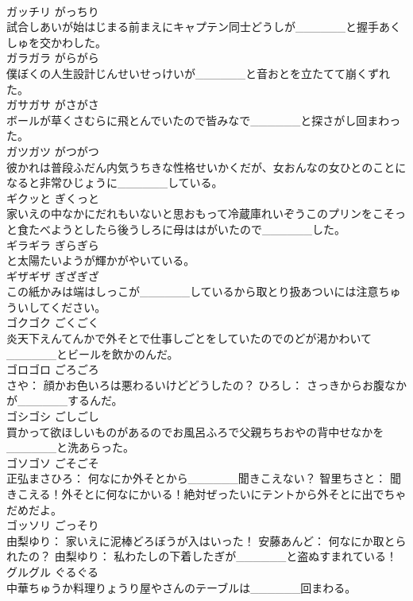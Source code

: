 \documentclass[8pt]{extreport}
\begin{document}
\begin{CJK}{UTF8}{min}
\\	ガッチリ	がっちり	
\\	試合しあいが始はじまる前まえにキャプテン同士どうしが______と握手あくしゅを交かわした。	
\\	ガラガラ	がらがら	
\\	僕ぼくの人生設計じんせいせっけいが______と音おとを立たてて崩くずれた。	
\\	ガサガサ	がさがさ	
\\	ボールが草くさむらに飛とんでいたので皆みなで______と探さがし回まわった。	
\\	ガツガツ	がつがつ	
\\	彼かれは普段ふだん内気うちきな性格せいかくだが、女おんなの女ひとのことになると非常ひじょうに______している。	
\\	ギクッと	ぎくっと	
\\	家いえの中なかにだれもいないと思おもって冷蔵庫れいぞうこのプリンをこそっと食たべようとしたら後うしろに母ははがいたので______した。	
\\	ギラギラ	ぎらぎら	
\\	と太陽たいようが輝かがやいている。	
\\	ギザギザ	ぎざぎざ	
\\	この紙かみは端はしっこが______しているから取とり扱あついには注意ちゅういしてください。	
\\	ゴクゴク	ごくごく	
\\	炎天下えんてんかで外そとで仕事しごとをしていたのでのどが渇かわいて______とビールを飲かのんだ。	
\\	ゴロゴロ	ごろごろ	
\\	さや： 顔かお色いろは悪わるいけどどうしたの？ ひろし： さっきからお腹なかが______するんだ。	
\\	ゴシゴシ	ごしごし	
\\	買かって欲ほしいものがあるのでお風呂ふろで父親ちちおやの背中せなかを______と洗あらった。	
\\	ゴソゴソ	ごそごそ	
\\	正弘まさひろ： 何なにか外そとから______聞きこえない？ 智里ちさと： 聞きこえる！外そとに何なにかいる！絶対ぜったいにテントから外そとに出でちゃだめだよ。	
\\	ゴッソリ	ごっそり	
\\	由梨ゆり： 家いえに泥棒どろぼうが入はいった！ 安藤あんど： 何なにか取とられたの？ 由梨ゆり： 私わたしの下着したぎが______と盗ぬすまれている！	
\\	グルグル	ぐるぐる	
\\	中華ちゅうか料理りょうり屋やさんのテーブルは______回まわる。	

\end{CJK}
\end{document}
